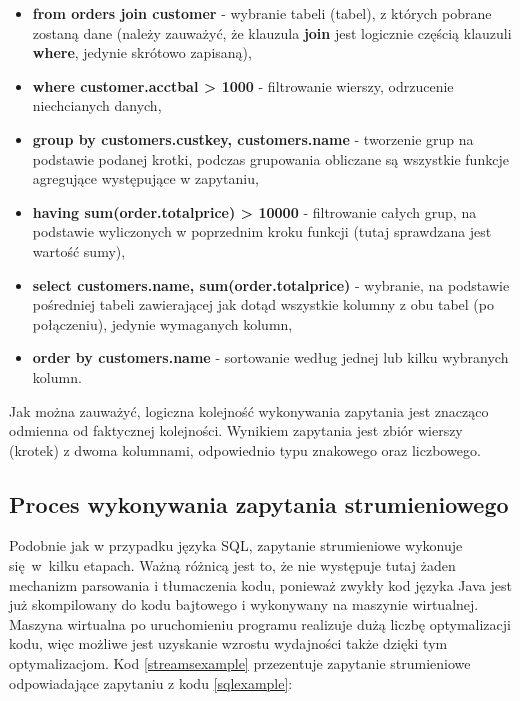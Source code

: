 \documentclass[12pt,twoside,openright]{extarticle}
\begin{document}
\begin{itemize}
    \item \textbf{from orders join customer} - wybranie tabeli (tabel), z których pobrane zostaną dane (należy zauważyć, że klauzula \textbf{join} jest logicznie częścią klauzuli \textbf{where}, jedynie skrótowo zapisaną),
    \item \textbf{where customer.acctbal > 1000} - filtrowanie wierszy, odrzucenie niechcianych danych,
    \item \textbf{group by customers.custkey, customers.name} - tworzenie grup na podstawie podanej krotki, podczas grupowania obliczane są wszystkie funkcje agregujące występujące w zapytaniu,
    \item \textbf{having sum(order.totalprice) > 10000} - filtrowanie całych grup, na podstawie wyliczonych w poprzednim kroku funkcji (tutaj sprawdzana jest wartość sumy),
    \item \textbf{select customers.name, sum(order.totalprice)} - wybranie, na podstawie pośredniej tabeli zawierającej jak dotąd wszystkie kolumny z obu tabel (po połączeniu), jedynie wymaganych kolumn,
    \item \textbf{order by customers.name} - sortowanie według jednej lub kilku wybranych kolumn.
\end{itemize}

    Jak można zauważyć, logiczna kolejność wykonywania zapytania jest znacząco odmienna od faktycznej kolejności. Wynikiem zapytania jest zbiór wierszy (krotek) z dwoma kolumnami, odpowiednio typu znakowego oraz liczbowego.

\subsection{Proces wykonywania zapytania strumieniowego}

    Podobnie jak w przypadku języka SQL, zapytanie strumieniowe wykonuje się w~kilku etapach. Ważną różnicą jest to, że nie występuje tutaj żaden mechanizm parsowania i tłumaczenia kodu, ponieważ zwykły kod języka Java jest już skompilowany do kodu bajtowego i wykonywany na maszynie wirtualnej. Maszyna wirtualna po uruchomieniu programu realizuje dużą liczbę optymalizacji kodu, więc możliwe jest uzyskanie wzrostu wydajności także dzięki tym optymalizacjom. Kod \ref{streamsexample} przezentuje zapytanie strumieniowe odpowiadające zapytaniu z kodu \ref{sqlexample}:
\end{document}
